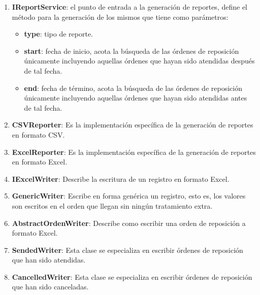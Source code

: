 \begin{enumerate}
	\item \textbf{IReportService}: el punto de entrada a la generación de reportes, define el método para la generación de los mismos que tiene como parámetros:
	\begin{itemize}
	 	\item \textbf{type}: tipo de reporte.
	 	\item \textbf{start}: fecha de inicio, acota la búsqueda de las órdenes de reposición únicamente incluyendo aquellas órdenes que hayan sido atendidas después de tal fecha.
	 	\item \textbf{end}: fecha de término, acota la búsqueda de las órdenes de reposición únicamente incluyendo aquellas órdenes que hayan sido atendidas antes de tal fecha.
	 \end{itemize}
	\item \textbf{CSVReporter}: Es la implementación específica de la generación de reportes en formato CSV.
	\item \textbf{ExcelReporter}: Es la implementación específica de la generación de reportes en formato Excel\textsuperscript{\textcopyright}.
	\item \textbf{IExcelWriter}: Describe la escritura de un registro en formato Excel\textsuperscript{\textcopyright}.
	\item \textbf{GenericWriter}: Escribe en forma genérica un registro, esto es, los valores son escritos en el orden que llegan sin ningún tratamiento extra. 
	\item \textbf{AbstractOrdenWriter}: Describe como escribir una orden de reposición a formato Excel\textsuperscript{\textcopyright}.
	\item \textbf{SendedWriter}: Esta clase se especializa en escribir órdenes de reposición que han sido atendidas.
	\item \textbf{CancelledWriter}: Esta clase se especializa en escribir órdenes de reposición que han sido canceladas.
\end{enumerate}



